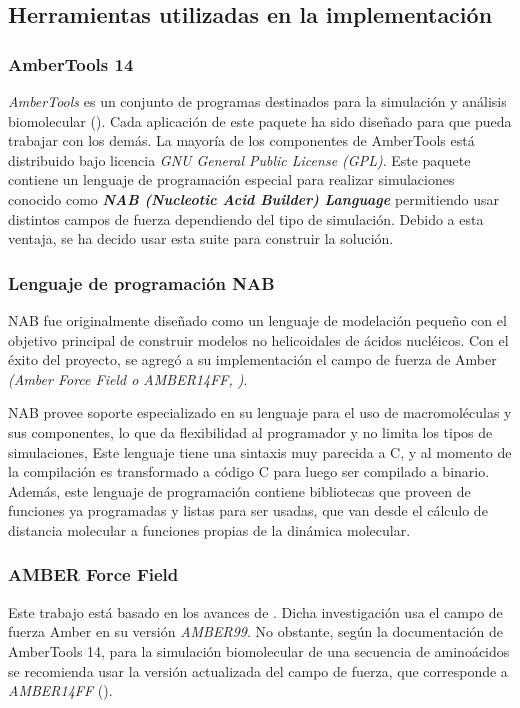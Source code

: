 \subsection{Herramientas utilizadas en la implementación}

\subsubsection{AmberTools 14}
\textit{AmberTools} es un conjunto de programas destinados para la simulación y análisis biomolecular (\citealp{amber14}). Cada aplicación de este paquete ha sido diseñado para que pueda trabajar con los demás. La mayoría de los componentes de AmberTools está distribuido bajo licencia \textit{GNU General Public License (GPL)}. Este paquete contiene un lenguaje de programación especial para realizar simulaciones conocido como \textit{\textbf{NAB (Nucleotic Acid Builder) Language}} permitiendo usar distintos campos de fuerza dependiendo del tipo de simulación. Debido a esta ventaja, se ha decido usar esta suite para construir la solución. 

\subsubsection{Lenguaje de programación NAB}
NAB fue originalmente diseñado como un lenguaje de modelación pequeño con el objetivo principal de construir modelos no helicoidales de ácidos nucléicos. Con el éxito del proyecto, se agregó a su implementación el campo de fuerza de Amber \textit{(Amber Force Field o AMBER14FF, \citealp{simmer})}. 

NAB provee soporte especializado en su lenguaje para el uso de macromoléculas y sus componentes, lo que da flexibilidad al programador y no limita los tipos de simulaciones, Este lenguaje tiene una sintaxis muy parecida a C, y al momento de la compilación es transformado a código C para luego ser compilado a binario. Además, este lenguaje de programación contiene bibliotecas que proveen de funciones ya programadas y listas para ser usadas, que van desde el cálculo de distancia molecular a funciones propias de la dinámica molecular.

\subsubsection{AMBER Force Field}
Este trabajo está basado en los avances de \cite{Dorn:2013}. Dicha investigación usa el campo de fuerza Amber en su versión \textit{AMBER99}. No obstante, según la documentación de AmberTools 14, para la simulación biomolecular de una secuencia de aminoácidos se recomienda usar la versión actualizada del campo de fuerza, que corresponde a \textit{AMBER14FF} (\citealp{simmer}).

